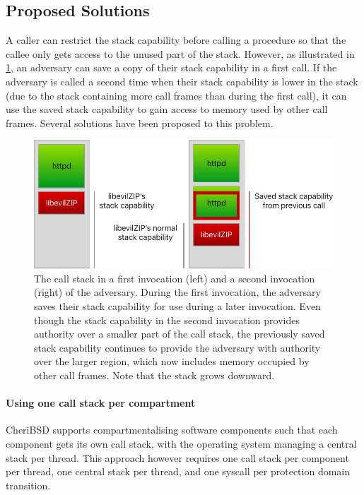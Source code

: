 \documentclass[main.tex]{subfiles}
\begin{document}

\subsection{Proposed Solutions}
A caller can restrict the stack capability before calling a procedure so that the callee only gets access to the unused part of the stack. However, as illustrated in \cref{fig:savedstackcap}, an adversary can save a copy of their stack capability in a first call. If the adversary is called a second time when their stack capability is lower in the stack (due to the stack containing more call frames than during the first call), it can use the saved stack capability to gain access to memory used by other call frames. Several solutions have been proposed to this problem.

\begin{figure}
	\begin{center}
		\includegraphics{Images/Saved Stack Cap.pdf}
	\end{center}
	\caption{The call stack in a first invocation (left) and a second invocation (right) of the adversary. During the first invocation, the adversary saves their stack capability for use during a later invocation. Even though the stack capability in the second invocation provides authority over a smaller part of the call stack, the previously saved stack capability continues to provide the adversary with authority over the larger region, which now includes memory occupied by other call frames. Note that the stack grows downward.}
	\label{fig:savedstackcap}
\end{figure}

\paragraph{Using one call stack per compartment} CheriBSD supports compartmentalising software components such that each component gets its own call stack, with the operating system managing a central stack per thread. This approach however requires one call stack per component per thread, one central stack per thread, and one syscall per protection domain transition.\cite{compartment}
\end{document}
